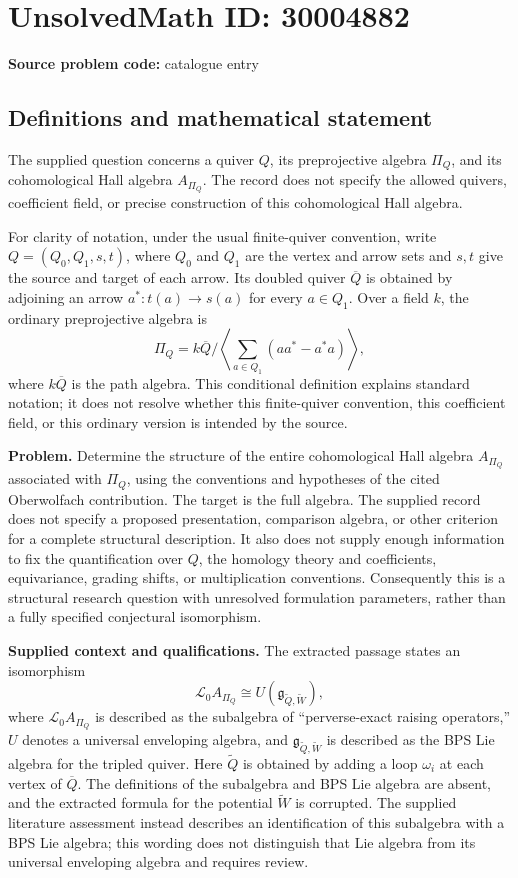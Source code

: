 \documentclass[11pt]{article}
\begin{document}
\section*{UnsolvedMath ID: 30004882}
\textbf{Source problem code:} catalogue entry
\subsection{Definitions and mathematical statement}
The supplied question concerns a quiver \(Q\), its preprojective algebra \(\Pi_Q\), and its cohomological Hall algebra \(A_{\Pi_Q}\). The record does not specify the allowed quivers, coefficient field, or precise construction of this cohomological Hall algebra.

For clarity of notation, under the usual finite-quiver convention, write \(Q=(Q_0,Q_1,s,t)\), where \(Q_0\) and \(Q_1\) are the vertex and arrow sets and \(s,t\) give the source and target of each arrow. Its doubled quiver \(\overline Q\) is obtained by adjoining an arrow \(a^*:t(a)\to s(a)\) for every \(a\in Q_1\). Over a field \(k\), the ordinary preprojective algebra is
\[
\Pi_Q=k\overline Q\Big/\left\langle\sum_{a\in Q_1}(aa^*-a^*a)\right\rangle,
\]
where \(k\overline Q\) is the path algebra. This conditional definition explains standard notation; it does not resolve whether this finite-quiver convention, this coefficient field, or this ordinary version is intended by the source.

\textbf{Problem.} Determine the structure of the entire cohomological Hall algebra \(A_{\Pi_Q}\) associated with \(\Pi_Q\), using the conventions and hypotheses of the cited Oberwolfach contribution. The target is the full algebra. The supplied record does not specify a proposed presentation, comparison algebra, or other criterion for a complete structural description. It also does not supply enough information to fix the quantification over \(Q\), the homology theory and coefficients, equivariance, grading shifts, or multiplication conventions. Consequently this is a structural research question with unresolved formulation parameters, rather than a fully specified conjectural isomorphism.

\textbf{Supplied context and qualifications.} The extracted passage states an isomorphism
\[
\mathcal L_0 A_{\Pi_Q}\cong U\!\left(\mathfrak g_{\widetilde Q,\widetilde W}\right),
\]
where \(\mathcal L_0 A_{\Pi_Q}\) is described as the subalgebra of ``perverse-exact raising operators,'' \(U\) denotes a universal enveloping algebra, and \(\mathfrak g_{\widetilde Q,\widetilde W}\) is described as the BPS Lie algebra for the tripled quiver. Here \(\widetilde Q\) is obtained by adding a loop \(\omega_i\) at each vertex of \(\overline Q\). The definitions of the subalgebra and BPS Lie algebra are absent, and the extracted formula for the potential \(\widetilde W\) is corrupted. The supplied literature assessment instead describes an identification of this subalgebra with a BPS Lie algebra; this wording does not distinguish that Lie algebra from its universal enveloping algebra and requires review.
\end{document}
